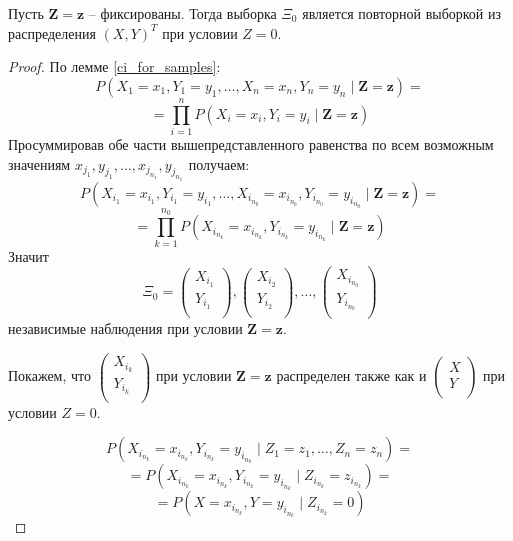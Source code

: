 \begin{theorem}
    Пусть $\mathbf{Z}=\mathbf{z}$ -- фиксированы. Тогда выборка $\Xi_0$ является повторной выборкой из распределения $(X,Y)^T$ при условии $Z=0$.
\end{theorem}
\begin{proof}
    По лемме \ref{ci_for_samples}:
    $$
    P(X_1=x_1,Y_1=y_1,\ldots,X_n=x_n,Y_n=y_n \mid \mathbf{Z}=\mathbf{z})=
    $$
    $$
    =\prod_{i=1}^n P(X_i=x_i, Y_i=y_i \mid \mathbf{Z}=\mathbf{z})
    $$
    Просуммировав обе части вышепредставленного равенства по всем возможным значениям 
    $x_{j_1}, y_{j_1}, \ldots, x_{j_{n_1}},y_{j_{n_1}}$ получаем:
    $$
    P(X_{i_1}=x_{i_1},Y_{i_1}=y_{i_1},\ldots,X_{i_{n_0}}=x_{i_{n_0}},Y_{i_{n_0}}=y_{i_{n_0}} \mid \mathbf{Z}=\mathbf{z})=
    $$
    $$
    =\prod_{k=1}^{n_0} P(X_{i_{n_k}}=x_{i_{n_k}}, Y_{i_{n_k}}=y_{i_{n_k}} \mid \mathbf{Z}=\mathbf{z})
    $$
    Значит $$
    \Xi_0=
    \begin{pmatrix}
        X_{i_1} \\
        Y_{i_1} \\
    \end{pmatrix},
    \begin{pmatrix}
        X_{i_2} \\
        Y_{i_2} \\
    \end{pmatrix}, \ldots,
    \begin{pmatrix}
        X_{i_{n_0}} \\
        Y_{i_{n_0}} \\
    \end{pmatrix} 
    $$
    независимые наблюдения при условии $\mathbf{Z}=\mathbf{z}$.

    Покажем, что $\begin{pmatrix}
        X_{i_k} \\
        Y_{i_k} \\
    \end{pmatrix}$ при условии $\mathbf{Z}=\mathbf{z}$ распределен также как и $\begin{pmatrix}
        X \\
        Y \\
    \end{pmatrix}$ при условии $Z=0$.

    $$
    P(X_{i_{n_k}}=x_{i_{n_k}}, Y_{i_{n_k}}=y_{i_{n_k}} \mid Z_1=z_1,\ldots,Z_n=z_n) = $$
    $$=P(X_{i_{n_k}}=x_{i_{n_k}}, Y_{i_{n_k}}=y_{i_{n_k}} \mid Z_{i_{n_k}}=z_{i_{n_k}}) = $$
    $$=P(X=x_{i_{n_k}}, Y=y_{i_{n_k}} \mid Z_{i_{n_k}}=0)$$
\end{proof}

